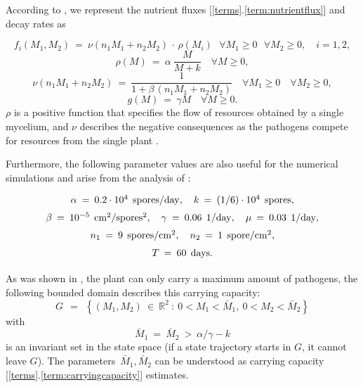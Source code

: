 \documentclass[11pt]{amsart}
\begin{document}
According to \cite{YegorovGrognardMailleretHalkettBernhard2019}, we represent
the nutrient fluxes [\ref{terms}.\ref{term:nutrientflux}] and decay rates as

\begin{equation}
f_i(M_1, M_2) \: = \: \nu(n_1 M_1 + n_2 M_2) \, \cdot \, \rho(M_i) \:\:\:
\forall M_1 \geqslant 0 \:\:\: \forall M_2 \geqslant 0, \quad i = 1,2, 
  \label{4}
\end{equation}
\begin{equation}
\rho(M) \: = \: \alpha \: \dfrac{M}{M + k} \quad \forall M \geqslant 0, 
  \label{5_1}
\end{equation}
\begin{equation}
\nu(n_1 M_1 + n_2 M_2) \: = \: \dfrac{1}{1 + \beta \, (n_1 M_1 + n_2 M_2)}
  \quad
\forall M_1 \geqslant 0 \quad \forall M_2 \geqslant 0,  \label{5_2}
\end{equation}
\begin{equation}
g(M) \: = \: \gamma M \quad \forall M \geqslant 0.  \label{6}
\end{equation}
$\rho$ is a positive function that specifies the flow of resources obtained by a single mycelium, and $\nu$ describes the negative consequences as the pathogens compete for resources from the single plant  \cite{YegorovGrognardMailleretHalkettBernhard2019}.

Furthermore, the following parameter values are also useful for the numerical
simulations and arise from the analysis of
\cite{YegorovGrognardMailleretHalkett2017}:
\begin{equation}
\arraycolsep=1.3pt
\def\arraystretch{1.5}
\begin{array}{c}
\alpha \: = \: 0.2 \cdot 10^4 \:\: \mathrm{spores} / \mathrm{day}, \quad
k \: = \: (1/6) \cdot 10^4 \:\: \mathrm{spores}, \\
\beta \: = \: 10^{-5} \:\: \mathrm{cm}^2 / \mathrm{spores}^2, \quad \gamma
  \: = \: 0.06 \:\: 1 / \mathrm{day}, \quad
\mu \: = \: 0.03 \:\: 1 / \mathrm{day}, \\
n_1 \: = \: 9 \:\: \mathrm{spores} / \mathrm{cm}^2, \quad n_2 \: = \: 1 \:\:
  \mathrm{spore} / \mathrm{cm}^2, \\
T \: = \: 60 \:\: \mathrm{days}.
\end{array}  \label{19}
\end{equation}

As was shown in \cite{YegorovGrognardMailleretHalkettBernhard2019}, the plant can only carry a maximum amount of pathogens, the following bounded
domain describes this carrying capacity:
\begin{equation}
G \:\: = \:\: \left\{ (M_1, M_2) \: \in \: \mathbb{R}^2 \: \colon \: 0 < M_1 <
  \bar{M}_1, \:
0 < M_2 < \bar{M}_2 \right\}  \label{2}
\end{equation}
with
\begin{equation}
\bar{M}_1 \: = \: \bar{M}_2 \: > \: \alpha / \gamma - k  \label{2_1}
\end{equation}
is an invariant set in the state space (if a state trajectory starts in $ G $,
it cannot leave $ G $). The parameters~$ \bar{M}_1, \bar{M}_2 $ can be
understood as 
carrying capacity [\ref{terms}.\ref{term:carryingcapacity}] estimates. 
\end{document}
